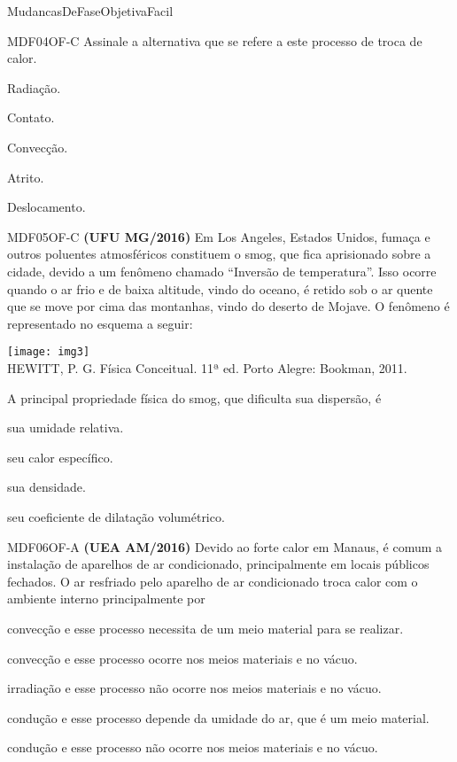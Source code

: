 \documentclass[12pt]{article}
\begin{document}
\begin{quiz}{MudancasDeFaseObjetivaFacil}
\begin{multi}[points=1]{MDF04OF-C}
			Assinale a alternativa que se refere a este processo de troca de calor.										
			\item Radiação.
			\item Contato.
			\item* Convecção.
			\item Atrito.
			\item Deslocamento.
		\end{multi}
		\begin{multi}[points=1]{MDF05OF-C}
			\textbf{(UFU MG/2016)} Em Los Angeles, Estados Unidos, fumaça e outros poluentes atmosféricos constituem o smog, que fica aprisionado sobre a cidade, devido a um fenômeno chamado “Inversão de temperatura”. Isso ocorre quando o ar frio e de baixa altitude, vindo do oceano, é retido sob o ar quente que se move por cima das montanhas, vindo do deserto de Mojave. O fenômeno é representado no esquema a seguir:
			\begin{center}
				\texttt{[image: img3]}\\HEWITT, P. G. Física Conceitual. 11ª ed. Porto Alegre: Bookman, 2011.			
			\end{center}
			A principal propriedade física do smog, que dificulta sua dispersão, é			
			\item sua umidade relativa.
			\item seu calor específico.
			\item* sua densidade.
			\item seu coeficiente de dilatação volumétrico.	
		\end{multi}	
		\begin{multi}[points=1]{MDF06OF-A}
			\textbf{(UEA AM/2016)} Devido ao forte calor em Manaus, é comum a instalação de aparelhos de ar condicionado, principalmente em locais públicos fechados. O ar resfriado pelo aparelho de ar condicionado troca calor com o ambiente interno principalmente por	
			\item* convecção e esse processo necessita de um meio material para se realizar.
			\item convecção e esse processo ocorre nos meios materiais e no vácuo.
			\item irradiação e esse processo não ocorre nos meios materiais e no vácuo.
			\item condução e esse processo depende da umidade do ar, que é um meio material.	
			\item condução e esse processo não ocorre nos meios materiais e no vácuo.
		\end{multi}

\end{quiz}
\end{document}
